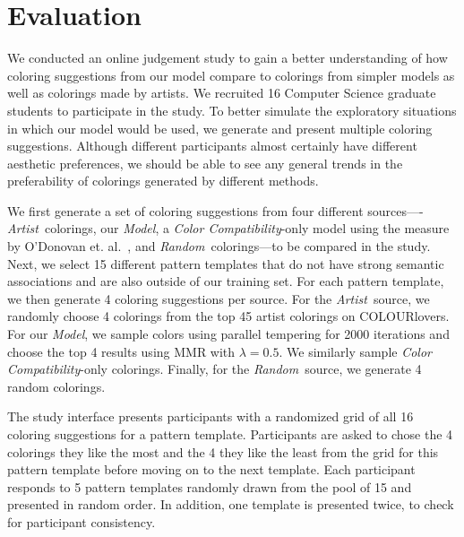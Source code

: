 \section{Evaluation}
\label{sec:evaluation}

We conducted an online judgement study to gain a better understanding of how coloring suggestions from our model compare to colorings from simpler models as well as colorings made by artists. We recruited 16 Computer Science graduate students to participate in the study. To better simulate the exploratory situations in which our model would be used, we generate and present multiple coloring suggestions. Although different participants almost certainly have different aesthetic preferences, we should be able to see any general trends in the preferability of colorings generated by different methods. 

\newcommand{\artistSource}{\emph{Artist}}
\newcommand{\modelSource}{\emph{Model}}
\newcommand{\compatSource}{\emph{Color Compatibility}}
\newcommand{\randomSource}{\emph{Random}}
We first generate a set of coloring suggestions from four different sources----\artistSource~colorings, our \modelSource, a \compatSource-only model using the measure by O'Donovan et. al.~, and \randomSource~colorings---to be compared in the study. Next, we select 15 different pattern templates that do not have strong semantic associations and are also outside of our training set. For each pattern template, we then generate 4 coloring suggestions per source. For the \artistSource~source, we randomly choose 4 colorings from the top 45 artist colorings on COLOURlovers. For our \modelSource, we sample colors using parallel tempering for 2000 iterations and choose the top 4 results using MMR with $\lambda = 0.5$. We similarly sample \compatSource-only colorings. Finally, for the \randomSource~source, we generate 4 random colorings.

The study interface presents participants with a randomized grid of all 16 coloring suggestions for a pattern template. Participants are asked to chose the 4 colorings they like the most and the 4 they like the least from the grid for this pattern template before moving on to the next template. Each participant responds to 5 pattern templates randomly drawn from the pool of 15 and presented in random order. In addition, one template is presented twice, to check for participant consistency.

